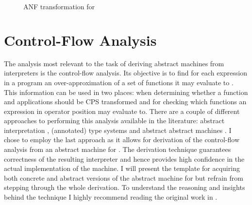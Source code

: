 \begin{figure}[t]
\begin{center}
\begin{tabular}{rll}
\end{tabular}
\endgroup
\end{center}
\caption{ANF transformation for \IDL{}}
\label{fig:transformer-anf}
\end{figure}


\section{Control-Flow Analysis}\label{sec:transformer-cfa}
The analysis most relevant to the task of deriving abstract machines from interpreters is the control-flow analysis.
Its objective is to find for each expression in a program an over-approximation of a set of functions it may evaluate to \cite{popa}.
This information can be used in two places: when determining whether a function and applications should be CPS transformed and for checking which functions an expression in operator position may evaluate to.
There are a couple of different approaches to performing this analysis available in the literature: abstract interpretation \cite{popa}, (annotated) type systems \cite{popa} and abstract abstract machines \cite{aam}.
I chose to employ the last approach as it allows for derivation of the control-flow analysis from an abstract machine for \IDL{}.
The derivation technique guarantees correctness of the resulting interpreter and hence provides high confidence in the actual implementation of the machine.
I will present the template for acquiring both concrete and abstract versions of the abstract machine for \IDL{} but refrain from stepping through the whole derivation.
To understand the reasoning and insights behind the technique I highly recommend reading the original work in \cite{aam}.


